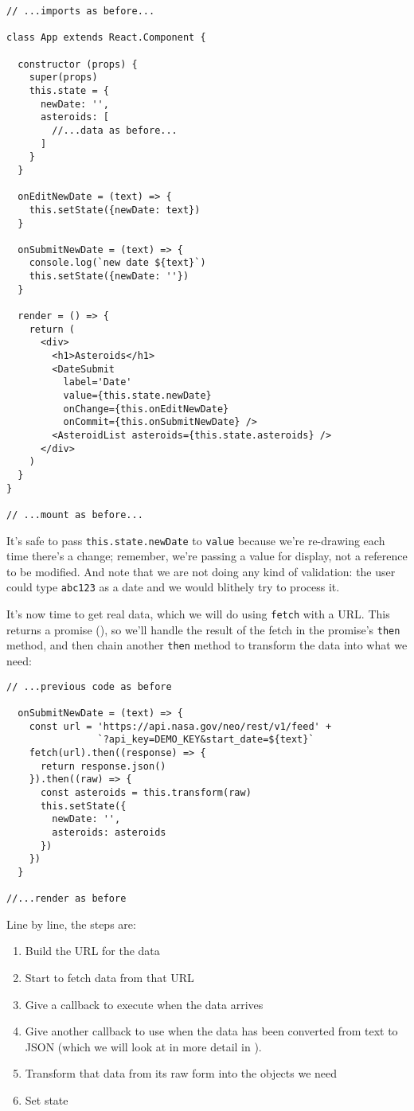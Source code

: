 \begin{verbatim}
// ...imports as before...

class App extends React.Component {

  constructor (props) {
    super(props)
    this.state = {
      newDate: '',
      asteroids: [
        //...data as before...
      ]
    }
  }

  onEditNewDate = (text) => {
    this.setState({newDate: text})
  }

  onSubmitNewDate = (text) => {
    console.log(`new date ${text}`)
    this.setState({newDate: ''})
  }

  render = () => {
    return (
      <div>
        <h1>Asteroids</h1>
        <DateSubmit
          label='Date'
          value={this.state.newDate}
          onChange={this.onEditNewDate}
          onCommit={this.onSubmitNewDate} />
        <AsteroidList asteroids={this.state.asteroids} />
      </div>
    )
  }
}

// ...mount as before...
\end{verbatim}

It's safe to pass \texttt{this.state.newDate} to \texttt{value}
because we're re-drawing each time there's a change;
remember, we're passing a value for display,
not a reference to be modified.
And note that we are not doing any kind of validation:
the user could type \texttt{abc123} as a date
and we would blithely try to process it.

It's now time to get real data,
which we will do using \texttt{fetch} with a URL.
This returns a promise (),
so we'll handle the result of the fetch in the promise's \texttt{then} method,
and then chain another \texttt{then} method to transform the data into what we need:

\begin{verbatim}
// ...previous code as before

  onSubmitNewDate = (text) => {
    const url = 'https://api.nasa.gov/neo/rest/v1/feed' +
                `?api_key=DEMO_KEY&start_date=${text}`
    fetch(url).then((response) => {
      return response.json()
    }).then((raw) => {
      const asteroids = this.transform(raw)
      this.setState({
        newDate: '',
        asteroids: asteroids
      })
    })
  }

//...render as before
\end{verbatim}

Line by line,
the steps are:

\begin{enumerate}
\item
  Build the URL for the data
\item
  Start to fetch data from that URL
\item
  Give a callback to execute when the data arrives
\item
  Give another callback to use when the data has been converted from text to JSON
  (which we will look at in more detail in ).
\item
  Transform that data from its raw form into the objects we need
\item
  Set state
\end{enumerate}

